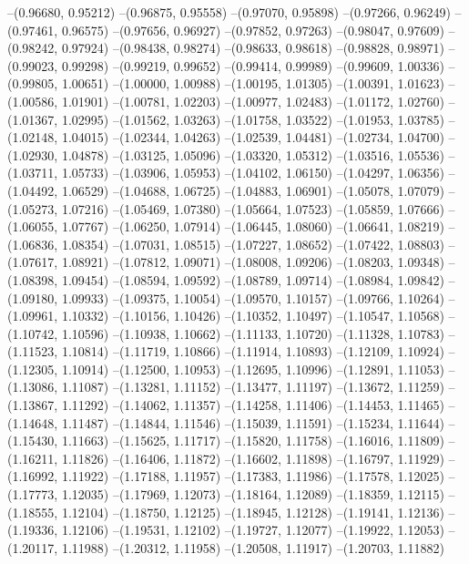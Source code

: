 --(0.96680, 0.95212)
--(0.96875, 0.95558)
--(0.97070, 0.95898)
--(0.97266, 0.96249)
--(0.97461, 0.96575)
--(0.97656, 0.96927)
--(0.97852, 0.97263)
--(0.98047, 0.97609)
--(0.98242, 0.97924)
--(0.98438, 0.98274)
--(0.98633, 0.98618)
--(0.98828, 0.98971)
--(0.99023, 0.99298)
--(0.99219, 0.99652)
--(0.99414, 0.99989)
--(0.99609, 1.00336)
--(0.99805, 1.00651)
--(1.00000, 1.00988)
--(1.00195, 1.01305)
--(1.00391, 1.01623)
--(1.00586, 1.01901)
--(1.00781, 1.02203)
--(1.00977, 1.02483)
--(1.01172, 1.02760)
--(1.01367, 1.02995)
--(1.01562, 1.03263)
--(1.01758, 1.03522)
--(1.01953, 1.03785)
--(1.02148, 1.04015)
--(1.02344, 1.04263)
--(1.02539, 1.04481)
--(1.02734, 1.04700)
--(1.02930, 1.04878)
--(1.03125, 1.05096)
--(1.03320, 1.05312)
--(1.03516, 1.05536)
--(1.03711, 1.05733)
--(1.03906, 1.05953)
--(1.04102, 1.06150)
--(1.04297, 1.06356)
--(1.04492, 1.06529)
--(1.04688, 1.06725)
--(1.04883, 1.06901)
--(1.05078, 1.07079)
--(1.05273, 1.07216)
--(1.05469, 1.07380)
--(1.05664, 1.07523)
--(1.05859, 1.07666)
--(1.06055, 1.07767)
--(1.06250, 1.07914)
--(1.06445, 1.08060)
--(1.06641, 1.08219)
--(1.06836, 1.08354)
--(1.07031, 1.08515)
--(1.07227, 1.08652)
--(1.07422, 1.08803)
--(1.07617, 1.08921)
--(1.07812, 1.09071)
--(1.08008, 1.09206)
--(1.08203, 1.09348)
--(1.08398, 1.09454)
--(1.08594, 1.09592)
--(1.08789, 1.09714)
--(1.08984, 1.09842)
--(1.09180, 1.09933)
--(1.09375, 1.10054)
--(1.09570, 1.10157)
--(1.09766, 1.10264)
--(1.09961, 1.10332)
--(1.10156, 1.10426)
--(1.10352, 1.10497)
--(1.10547, 1.10568)
--(1.10742, 1.10596)
--(1.10938, 1.10662)
--(1.11133, 1.10720)
--(1.11328, 1.10783)
--(1.11523, 1.10814)
--(1.11719, 1.10866)
--(1.11914, 1.10893)
--(1.12109, 1.10924)
--(1.12305, 1.10914)
--(1.12500, 1.10953)
--(1.12695, 1.10996)
--(1.12891, 1.11053)
--(1.13086, 1.11087)
--(1.13281, 1.11152)
--(1.13477, 1.11197)
--(1.13672, 1.11259)
--(1.13867, 1.11292)
--(1.14062, 1.11357)
--(1.14258, 1.11406)
--(1.14453, 1.11465)
--(1.14648, 1.11487)
--(1.14844, 1.11546)
--(1.15039, 1.11591)
--(1.15234, 1.11644)
--(1.15430, 1.11663)
--(1.15625, 1.11717)
--(1.15820, 1.11758)
--(1.16016, 1.11809)
--(1.16211, 1.11826)
--(1.16406, 1.11872)
--(1.16602, 1.11898)
--(1.16797, 1.11929)
--(1.16992, 1.11922)
--(1.17188, 1.11957)
--(1.17383, 1.11986)
--(1.17578, 1.12025)
--(1.17773, 1.12035)
--(1.17969, 1.12073)
--(1.18164, 1.12089)
--(1.18359, 1.12115)
--(1.18555, 1.12104)
--(1.18750, 1.12125)
--(1.18945, 1.12128)
--(1.19141, 1.12136)
--(1.19336, 1.12106)
--(1.19531, 1.12102)
--(1.19727, 1.12077)
--(1.19922, 1.12053)
--(1.20117, 1.11988)
--(1.20312, 1.11958)
--(1.20508, 1.11917)
--(1.20703, 1.11882)
